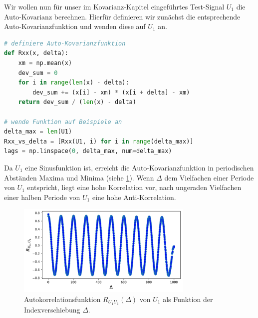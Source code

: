 Wir wollen nun für unser im Kovarianz-Kapitel eingeführtes Test-Signal $U_1$ die Auto-Kovarianz berechnen. Hierfür definieren wir zunächst die entsprechende Auto-Kovarianzfunktion und wenden diese auf $U_1$ an.
\begin{lstlisting}[language = Python]
# definiere Auto-Kovarianzfunktion
def Rxx(x, delta):
    xm = np.mean(x)
    dev_sum = 0
    for i in range(len(x) - delta):
        dev_sum += (x[i] - xm) * (x[i + delta] - xm)
    return dev_sum / (len(x) - delta)

# wende Funktion auf Beispiele an 
delta_max = len(U1)
Rxx_vs_delta = [Rxx(U1, i) for i in range(delta_max)]
lags = np.linspace(0, delta_max, num=delta_max)
\end{lstlisting}
Da $U_1$ eine Sinusfunktion ist,  erreicht die Auto-Kovarianzfunktion in periodischen Abständen Maxima und Minima (siehe   \ref{fig:AutokorrelationU1}). Wenn $\Delta$ dem Vielfachen einer Periode von $U_1$ entspricht, liegt eine hohe Korrelation vor, nach ungeraden Vielfachen einer halben Periode von $U_1$ eine hohe Anti-Korrelation.   
\begin{figure}[H]
\centering
\includegraphics[width=0.75\textwidth]{Figures/U1Auto.pdf}
\caption{Autokorrelationsfunktion $R_{U_1U_1}(\Delta)$ von $U_1$ als Funktion der Indexverschiebung $\Delta$.}
\label{fig:AutokorrelationU1}
\end{figure}




